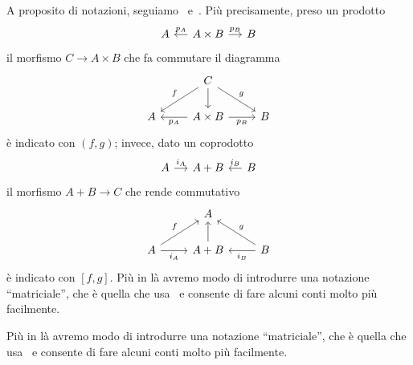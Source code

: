 \begin{notation}
  A proposito di notazioni, seguiamo~\cite{leinster:categories}
  e~\cite{riehl:categories}. Più precisamente, preso un prodotto
  \[
    \begin{tikzcd}[column sep=small]
      A & A \times B \ar["{p_A}", l, swap] \ar["{p_B}", r] & B
    \end{tikzcd}
  \]
  il morfismo \(C \to A \times B\) che fa commutare il diagramma
  \[
    \begin{tikzcd}
      & C \ar["{f}", dl, swap] \ar[d] \ar["{g}", dr] \\
      A & A \times B \ar["{p_A}", l] \ar["{p_B}", r, swap] & B
    \end{tikzcd}
  \]
  è indicato con \((f, g)\); invece, dato un coprodotto
  \[
    \begin{tikzcd}[column sep=small]
      A \ar["{i_A}", r] & A + B & B \ar["{i_B}", l, swap]
    \end{tikzcd}
  \]
  il morfismo \(A+B \to C\) che rende commutativo
  \[
    \begin{tikzcd}
      & A \\
      A \ar["{i_A}", r, swap] \ar["{f}", ur] & A + B \ar[u] & B
      \ar["{i_B}", l] \ar["{g}", ul, swap]
    \end{tikzcd}
  \]
  è indicato con \([f, g]\). Più in là avremo modo di introdurre una
  notazione ``matriciale'', che è quella che
  usa~\cite{buehler:exactcategories} e consente di fare alcuni conti
  molto più facilmente.
\end{notation}

Più in là avremo modo di introdurre una notazione ``matriciale'', che è
quella che usa~\cite{buehler:exactcategories} e consente di fare alcuni
conti molto più facilmente.

